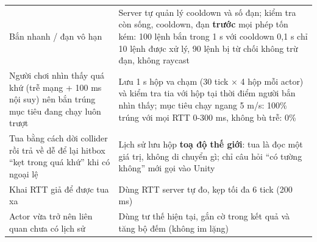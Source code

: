 \begin{center}\small
\begin{tabularx}{\linewidth}{|L{4.4cm}|Y|}
\hline
{} &  \\ \hline
Bắn nhanh / đạn vô hạn & Server tự quản lý cooldown và số đạn; kiểm tra còn sống, cooldown, đạn \textbf{trước} mọi phép tốn kém: 100 lệnh bắn trong 1 s với cooldown 0,1 s chỉ 10 lệnh được xử lý, 90 lệnh bị từ chối không trừ đạn, không raycast \\ \hline
Người chơi nhìn thấy quá khứ (trễ mạng + 100 ms nội suy) nên bắn trúng mục tiêu đang chạy luôn trượt & Lưu 1 s hộp va chạm (30 tick $\times$ 4 hộp mỗi actor) và kiểm tra tia với hộp tại thời điểm người bắn nhìn thấy; mục tiêu chạy ngang 5 m/s: 100\% trúng với mọi RTT 0-300 ms, không bù trễ: 0\% \\ \hline
Tua bằng cách dời collider rồi trả về dễ để lại hitbox ``kẹt trong quá khứ'' khi có ngoại lệ & Lịch sử lưu hộp \textbf{toạ độ thế giới}: tua là đọc một giá trị, không di chuyển gì; chỉ câu hỏi ``có tường không'' mới gọi vào Unity \\ \hline
Khai RTT giả để được tua xa & Dùng RTT server tự đo, kẹp tối đa 6 tick (200 ms) \\ \hline
Actor vừa trở nên liên quan chưa có lịch sử & Dùng tư thế hiện tại, gắn cờ trong kết quả và tăng bộ đếm (không im lặng) \\ \hline
\end{tabularx}
\end{center}

